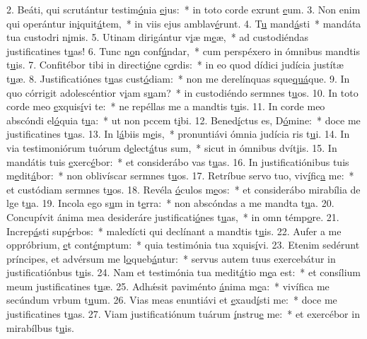 2. Beáti, qui scrutántur testim\uline{ó}nia \uline{e}jus:~* in toto corde exrunt \uline{e}um.
3. Non enim qui operántur in\uline{i}quit\uline{á}tem,~* in viis ejus amblav\uline{é}runt.
4. T\uline{u} mand\uline{á}sti~* mandáta tua custodri n\uline{i}mis.
5. Utinam dirigántur v\uline{i}æ m\uline{e}æ,~* ad custodiéndas justificatines t\uline{u}as!
6. Tunc n\uline{o}n conf\uline{ú}ndar,~* cum perspéxero in ómnibus mandtis t\uline{u}is.
7. Confitébor tibi in directi\uline{ó}ne c\uline{o}rdis:~* in eo quod dídici judícia justítæ t\uline{u}æ.
8. Justificatiónes t\uline{u}as cust\uline{ó}diam:~* non me derelínquas sque\uline{quá}que.
9. In quo córrigit adolescéntior v\uline{i}am s\uline{u}am?~* in custodiéndo sermnes t\uline{u}os.
10. In toto corde meo \uline{e}xquis\uline{í}vi te:~* ne repéllas me a mandtis t\uline{u}is.
11. In corde meo abscóndi el\uline{ó}quia t\uline{u}a:~* ut non pccem t\uline{i}bi.
12. Bened\uline{í}ctus es, D\uline{ó}mine:~* doce me justificatines t\uline{u}as.
13. In l\uline{á}biis m\uline{e}is,~* pronuntiávi ómnia judícia ris t\uline{u}i.
14. In via testimoniórum tuórum d\uline{e}lect\uline{á}tus sum,~* sicut in ómnibus dvít\uline{i}is.
15. In mandátis tuis \uline{e}xerc\uline{é}bor:~* et considerábo vas t\uline{u}as.
16. In justificatiónibus tuis m\uline{e}dit\uline{á}bor:~* non oblivíscar sermnes t\uline{u}os.
17. Retríbue servo tuo, viv\uline{í}fic\uline{a} me:~* et custódiam sermnes t\uline{u}os.
18. Revéla \uline{ó}culos m\uline{e}os:~* et considerábo mirabília de lge t\uline{u}a.
19. Incola ego s\uline{u}m in t\uline{e}rra:~* non abscóndas a me mandta t\uline{u}a.
20. Concupívit ánima mea desideráre justificati\uline{ó}nes t\uline{u}as,~* in omn témp\uline{o}re.
21. Increp\uline{á}sti sup\uline{é}rbos:~* maledícti qui declínant a mandtis t\uline{u}is.
22. Aufer a me oppróbrium, \uline{e}t cont\uline{é}mptum:~* quia testimónia tua xquis\uline{í}vi.
23. Etenim sedérunt príncipes, et advérsum me l\uline{o}queb\uline{á}ntur:~* servus autem tuus exercebátur in justificatiónbus t\uline{u}is.
24. Nam et testimónia tua medit\uline{á}tio m\uline{e}a est:~* et consílium meum justificatines t\uline{u}æ.
25. Adhǽsit paviménto \uline{á}nima m\uline{e}a:~* vivífica me secúndum vrbum t\uline{u}um.
26. Vias meas enuntiávi et \uline{e}xaud\uline{í}sti me:~* doce me justificatines t\uline{u}as.
27. Viam justificatiónum tuárum \uline{í}nstru\uline{e} me:~* et exercébor in mirabílbus t\uline{u}is.
